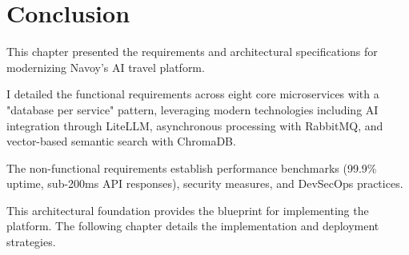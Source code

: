 \setcounter{secnumdepth}{0} %
\section{Conclusion}
This chapter presented the requirements and architectural specifications for modernizing Navoy's AI travel platform.

I detailed the functional requirements across eight core microservices with a "database per service" pattern, leveraging modern technologies including AI integration through LiteLLM, asynchronous processing with RabbitMQ, and vector-based semantic search with ChromaDB.

The non-functional requirements establish performance benchmarks (99.9\% uptime, sub-200ms API responses), security measures, and DevSecOps practices.

This architectural foundation provides the blueprint for implementing the platform. The following chapter details the implementation and deployment strategies.
